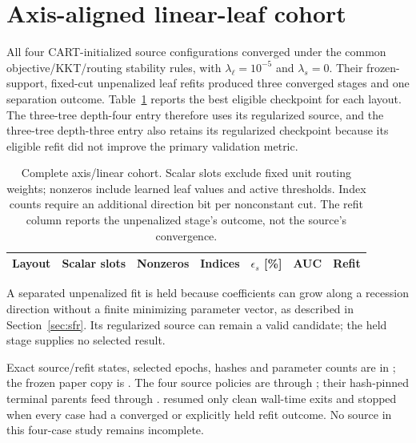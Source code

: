 \section{Axis-aligned linear-leaf cohort}
\label{app:axis}
All four CART-initialized source configurations converged under the common
objective/KKT/routing stability rules, with $\lambda_\ell=10^{-5}$ and
$\lambda_s=0$. Their frozen-support, fixed-cut unpenalized leaf refits produced
three converged stages and one separation outcome. Table~\ref{tab:axis-cohort}
reports the best eligible checkpoint for each layout. The three-tree depth-four
entry therefore uses its regularized source, and the three-tree depth-three
entry also retains its regularized checkpoint because its eligible refit did
not improve the primary validation metric.

\begin{table}[htbp]\centering\small
\caption{Complete axis/linear cohort. Scalar slots exclude fixed unit routing
weights; nonzeros include learned leaf values and active thresholds. Index
counts require an additional direction bit per nonconstant cut. The refit
column reports the unpenalized stage's outcome, not the source's convergence.}
\label{tab:axis-cohort}\setlength{\tabcolsep}{4pt}
\begin{tabular}{@{}lrrrrrl@{}}\toprule
Layout & Scalar slots & Nonzeros & Indices & $\epsilon_s$ [\%] & AUC & Refit\\\midrule
\end{tabular}
\end{table}
A separated unpenalized fit is held because coefficients can grow along a
recession direction without a finite minimizing parameter vector, as described
in Section~\ref{sec:sfr}. Its regularized source can remain a valid
candidate; the held stage supplies no selected result.

\begin{implementation}
Exact source/refit states, selected epochs, hashes and parameter counts are in
; the frozen paper copy is
. The four source policies are
 through ; their
hash-pinned terminal parents feed  through .
 resumed only clean wall-time exits and
stopped when every case had a converged or explicitly held refit outcome.
No source in this four-case study remains incomplete.
\end{implementation}
